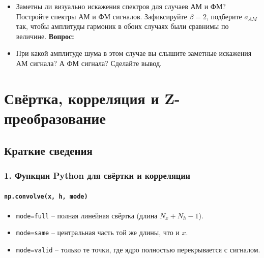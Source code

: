 \documentclass[12pt,a4paper,openany]{book}
\providecommand{\tightlist}{\setlength{\itemsep}{0pt}\setlength{\parskip}{0pt}}
\begin{document}
\begin{itemize}
\tightlist
\item
  Заметны ли визуально искажения спектров для случаев АМ и ФМ?
  Постройте спектры АМ и ФМ сигналов. Зафиксируйте \(\beta=2\), подберите \(a_{AM}\) так, чтобы амплитуды гармоник в обоих случаях были сравнимы по величине.
  \textbf{Вопрос:}
\item
  При какой амплитуде шума в этом случае вы слышите заметные искажения АМ сигнала? А ФМ сигнала? Сделайте вывод.
\end{itemize}


\chapter{Свёртка, корреляция и Z-преобразование}

\section*{Краткие сведения}

\subsection*{1. Функции Python для свёртки и корреляции}

\subsubsection*{\texorpdfstring{\texttt{np.\allowbreak{}convolve(\allowbreak{}x,\allowbreak{}\ h,\allowbreak{}\ mode)}}{np.convolve(x, h, mode)}}

\begin{itemize}
\tightlist
\item
  \texttt{mode=\allowbreak{}\textquotesingle{}\allowbreak{}full\textquotesingle{}\allowbreak{}} -- полная линейная свёртка (длина \(N_x+N_h-1\)).
\item
  \texttt{mode=\allowbreak{}\textquotesingle{}\allowbreak{}same\textquotesingle{}\allowbreak{}} -- центральная часть той же длины, что и \(x\).
\item
  \texttt{mode=\allowbreak{}\textquotesingle{}\allowbreak{}valid\textquotesingle{}\allowbreak{}} -- только те точки, где ядро полностью перекрывается с сигналом.
\end{itemize}
\end{document}
